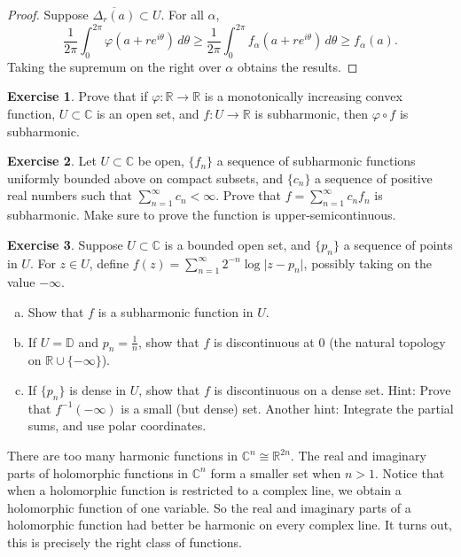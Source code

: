 \documentclass[12pt,openany]{book}
\newcommand{\sabs}[1]{\lvert {#1} \rvert}
\newcommand{\C}{{\mathbb{C}}}
\newcommand{\R}{{\mathbb{R}}}
\newcommand{\D}{{\mathbb{D}}}
\theoremstyle{plain}
\theoremstyle{remark}
\theoremstyle{definition}
\newenvironment{exbox}{%
    \def\FrameCommand{\vrule width 1pt \relax\hspace{10pt}}%
    \MakeFramed{\advance\hsize-\width\FrameRestore}%
}{%
    \endMakeFramed
}
\newenvironment{exparts}{%
    \leavevmode\begin{enumerate}[a),noitemsep,topsep=0pt,parsep=0pt,partopsep=0pt]
}{%
    \end{enumerate}
}
\theoremstyle{exercise}
\newtheorem{exercise}{Exercise}[section]
\theoremstyle{example}
\begin{document}
\begin{proof}
Suppose $\overline{\Delta_r(a)} \subset U$.  For all $\alpha$,
\begin{equation*}
\frac{1}{2\pi} \int_0^{2\pi} \varphi (a+re^{i\theta})\, d\theta
\geq
\frac{1}{2\pi} \int_0^{2\pi} f_\alpha (a+re^{i\theta})\, d\theta
\geq f_\alpha(a) .
\end{equation*}
Taking the supremum on the right over $\alpha$ obtains the results.
\end{proof}

\begin{exbox}
\begin{exercise}
Prove that if $\varphi \colon \R \to \R$ is a monotonically increasing
convex function, $U \subset \C$ is an open set, and $f \colon U \to \R$
is subharmonic, then $\varphi \circ f$ is subharmonic.
\end{exercise}

\begin{exercise}
Let $U \subset \C$ be open, $\{ f_n \}$ a sequence of
subharmonic functions uniformly bounded above on compact subsets, and
$\{ c_n \}$ a sequence of positive real numbers such that
$\sum_{n=1}^\infty c_n < \infty$.
Prove that $f = \sum_{n=1}^\infty c_n f_n$ is subharmonic.  Make sure to prove
the function is upper-semicontinuous.
\end{exercise}

\begin{exercise}
\pagebreak[2]%
Suppose $U \subset \C$ is a bounded open set, and $\{ p_n \}$ a sequence of points in
$U$. For $z \in U$, define
$f(z) = \sum_{n=1}^\infty 2^{-n} \log \sabs{z-p_n}$, possibly taking on the
value $-\infty$.
\begin{exparts}
\item
Show that $f$ is a subharmonic function in $U$.
\item
If $U = \D$ and $p_n = \frac{1}{n}$, show that $f$ is discontinuous at 0
(the natural topology on $\R \cup \{ -\infty \}$).
\item
If $\{ p_n \}$ is dense in $U$, show that $f$
is discontinuous on a dense set.
Hint: Prove that $f^{-1}(-\infty)$ is a small (but dense) set.
Another hint: Integrate the partial sums, and use polar coordinates.
\end{exparts}
\end{exercise}
\end{exbox}

\pagebreak[2]
There are too many harmonic functions in $\C^n \cong \R^{2n}$.
The real and imaginary parts of holomorphic functions in $\C^n$
form a smaller set when $n > 1$.  Notice that when a holomorphic
function is restricted to a complex line, we obtain a holomorphic
function of one variable.  So the real and imaginary parts
of a holomorphic function had better be harmonic on every complex line.
It turns out, this is precisely the right class of functions.
\end{document}
